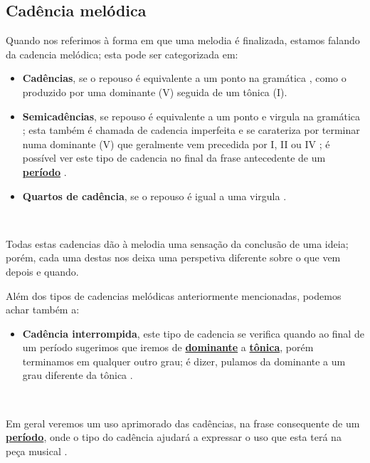 \subsection{Cadência melódica} 
\label{subsec:cadenciamelodica}
Quando nos referimos à forma em que uma melodia é finalizada,
estamos falando da cadencia melódica; esta pode ser categorizada em: 
\begin{itemize}
\item \textbf{Cadências}, se o repouso é equivalente a um ponto na gramática \cite[pp. 66,67]{melcior1859diccionario},
como o produzido por uma dominante (V) seguida de um tônica (I).
\item \textbf{Semicadências}, se repouso é equivalente a um ponto e virgula na gramática \cite[pp. 66,67]{melcior1859diccionario};
esta também é chamada de cadencia imperfeita e se carateriza por terminar numa dominante (V) 
que geralmente vem precedida por  I, II ou IV \cite[pp. 103]{grabner2001teoria}; 
é possível ver este tipo de cadencia no final da frase antecedente de um 
\hyperref[sec:Periodo]{\textbf{período}} \cite[pp. 21]{latham2008diccionario}.
\item \textbf{Quartos de cadência}, se o repouso é igual a uma virgula \cite[pp. 66,67]{melcior1859diccionario}.
\end{itemize}~

Todas estas cadencias dão à melodia uma sensação da conclusão de uma ideia; 
porém, cada uma destas nos deixa uma perspetiva diferente sobre o que vem depois e quando.

Além dos tipos de cadencias melódicas anteriormente mencionadas, podemos achar também a:
\begin{itemize}
\item \textbf{Cadência interrompida}, este tipo de cadencia se verifica 
quando ao final de um período sugerimos que iremos de 
\hyperref[sec:dominante]{\textbf{dominante}} a \hyperref[sec:Tonica]{\textbf{tônica}},
porém terminamos em qualquer outro grau; é dizer, pulamos da dominante a um grau diferente da tônica 
\cite[pp. 67]{melcior1859diccionario} \cite[pp. 60]{pedrell2009diccionario}. 
\end{itemize}~

Em geral veremos um uso aprimorado das cadências, na frase consequente de um \hyperref[sec:Periodo]{\textbf{período}},
onde o tipo do cadência ajudará a expressar o uso que esta terá na peça musical  \cite[pp. 66,67]{melcior1859diccionario}.

